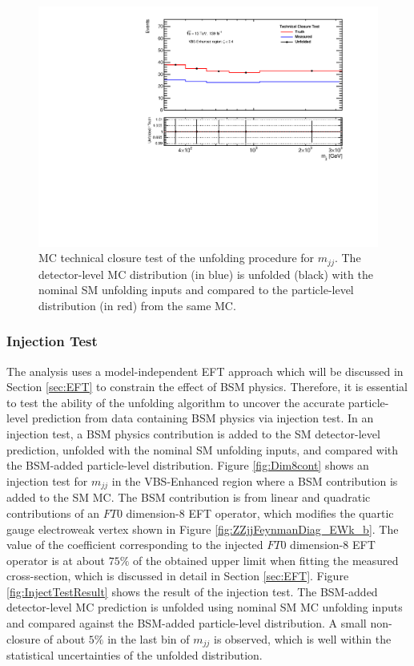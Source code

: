 \begin{figure}[!htbp]
\centering
\includegraphics[width=.6\textwidth]{figures/Analysis/Unfolding/technical_closure_VBS_Enhanced.pdf}
\caption{MC technical closure test of the unfolding procedure for $m_{jj}$. The detector-level MC distribution (in blue) is unfolded (black) with the nominal SM unfolding inputs and compared to the particle-level distribution (in red) from the same MC.\label{fig:unfolding_technical_closure}}
\end{figure}

\subsubsection{Injection Test}
\label{subsubsec:InjectionTest}
The analysis uses a model-independent EFT approach which will be discussed in Section \ref{sec:EFT} to constrain the effect of BSM physics. Therefore, it is essential to test the ability of the unfolding algorithm to uncover the accurate particle-level prediction from data containing BSM physics via injection test. In an injection test, a BSM physics contribution is added to the SM detector-level prediction, unfolded with the nominal SM unfolding inputs, and compared with the BSM-added particle-level distribution. Figure \ref{fig:Dim8cont} shows an injection test for $m_{jj}$ in the VBS-Enhanced region where a BSM contribution is added to the SM MC. The BSM contribution is from linear and quadratic contributions of an $FT0$ dimension-8 EFT operator, which modifies the quartic gauge electroweak vertex shown in Figure \ref{fig:ZZjjFeynmanDiag_EWk_b}. The value of the coefficient corresponding to the injected $FT0$ dimension-8 EFT operator is at about $75\%$ of the obtained upper limit when fitting the measured cross-section, which is discussed in detail in Section \ref{sec:EFT}. Figure \ref{fig:InjectTestResult} shows the result of the injection test. The BSM-added detector-level MC prediction is unfolded using nominal SM MC unfolding inputs and compared against the BSM-added particle-level distribution. A small non-closure of about $5\%$ in the last bin of $m_{jj}$ is observed, which is well within the statistical uncertainties of the unfolded distribution.


